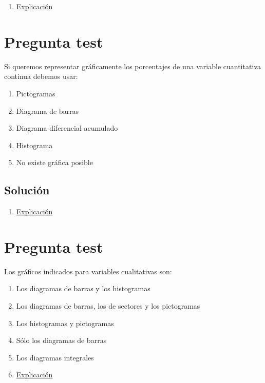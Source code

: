 \documentclass[
]{book}
\providecommand{\tightlist}{%
  \setlength{\itemsep}{0pt}\setlength{\parskip}{0pt}}
\begin{document}
\begin{enumerate}
\def\labelenumi{\alph{enumi})}
\setcounter{enumi}{1}
\tightlist
\item
  \href{https://1fjmanzano.github.io/bioestadistica/otros-gra\%CC\%81ficos.html}{Explicación}
\end{enumerate}

\hypertarget{pregunta-test-23}{%
\section{Pregunta test}\label{pregunta-test-23}}

Si queremos representar gráficamente los porcentajes de una variable cuantitativa continua debemos usar:

\begin{enumerate}
\def\labelenumi{\alph{enumi})}
\tightlist
\item
  Pictogramas
\item
  Diagrama de barras
\item
  Diagrama diferencial acumulado
\item
  Histograma
\item
  No existe gráfica posible
\end{enumerate}

\hypertarget{soluciuxf3n-23}{%
\subsection{Solución}\label{soluciuxf3n-23}}

\begin{enumerate}
\def\labelenumi{\alph{enumi})}
\setcounter{enumi}{3}
\tightlist
\item
  \href{https://1fjmanzano.github.io/bioestadistica/histogramas.html}{Explicación}
\end{enumerate}

\hypertarget{pregunta-test-24}{%
\section{Pregunta test}\label{pregunta-test-24}}

Los gráficos indicados para variables cualitativas son:

\begin{enumerate}
\def\labelenumi{\alph{enumi})}
\item
  Los diagramas de barras y los histogramas
\item
  Los diagramas de barras, los de sectores y los pictogramas
\item
  Los histogramas y pictogramas
\item
  Sólo los diagramas de barras
\item
  Los diagramas integrales
\item
  \href{https://1fjmanzano.github.io/bioestadistica/diagramas-de-barras-y-sectores.html}{Explicación}
\end{enumerate}
\end{document}
